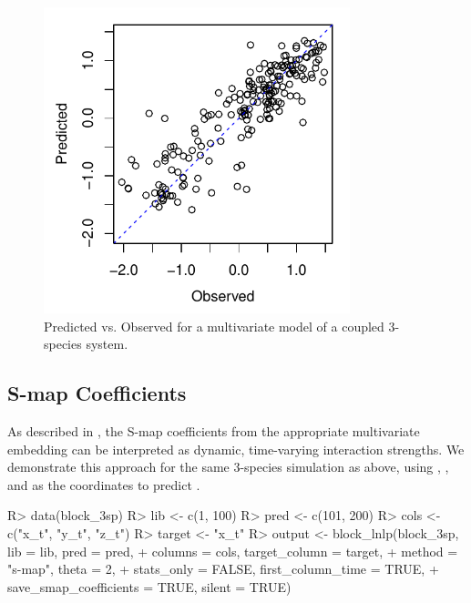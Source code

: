 \documentclass[article]{jss}
\begin{document}
\begin{figure}[t!]
\centering
\includegraphics[width=3.5in]{article-block-lnlp-obs-vs-pred}
\caption{\label{fig:block-lnlp-obs-vs-pred} Predicted vs. Observed for a multivariate model of a coupled 3-species system.}
\end{figure}

\subsection{S-map Coefficients}\label{sec:s-map-coefficients}

As described in \citet{Deyle_2016}, the S-map coefficients from the appropriate multivariate embedding can be interpreted as dynamic, time-varying interaction strengths. We demonstrate this approach for the same 3-species simulation as above, using , , and  as the coordinates to predict .

\begin{Schunk}
\begin{Sinput}
R> data(block_3sp)
R> lib <- c(1, 100)
R> pred <- c(101, 200)
R> cols <- c("x_t", "y_t", "z_t")
R> target <- "x_t"
R> output <- block_lnlp(block_3sp, lib = lib, pred = pred,
+                       columns = cols, target_column = target, 
+                       method = "s-map", theta = 2, 
+                       stats_only = FALSE, first_column_time = TRUE, 
+                       save_smap_coefficients = TRUE, silent = TRUE)
\end{Sinput}
\end{Schunk}
\end{document}

